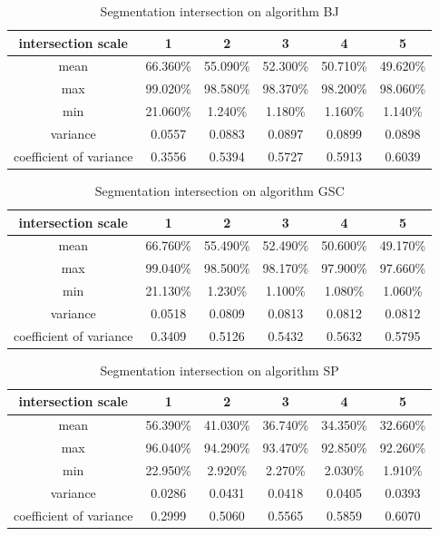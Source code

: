 \documentclass[runningheads,a4paper]{llncs}
\begin{document}
\begin{table}
\centering
\begin{tabular}{|c|c|c|c|c|c|}
\hline
 intersection scale & 1 & 2 & 3 & 4& 5 \\
\hline
mean& 66.360\% & 55.090\% & 52.300\% & 50.710\%& 49.620\% \\
\hline
max& 99.020\% & 98.580\% & 98.370\% & 98.200\%& 98.060\% \\
\hline
min& 21.060\% & 1.240\% & 1.180\% & 1.160\%& 1.140\%\\
\hline
variance& 0.0557 & 0.0883 & 0.0897 & 0.0899& 0.0898 \\
\hline
coefficient of variance& 0.3556 & 0.5394 & 0.5727 & 0.5913& 0.6039\\
\hline
\end{tabular}
\caption{Segmentation intersection on algorithm BJ}
\label{ta:bj intersection}
\end{table}

\begin{table}
\centering
\begin{tabular}{|c|c|c|c|c|c|}
\hline
intersection scale & 1 & 2 & 3 & 4& 5 \\
\hline
mean& 66.760\% & 55.490\% & 52.490\% & 50.600\%& 49.170\% \\
\hline
max& 99.040\% & 98.500\% & 98.170\% & 97.900\%& 97.660\% \\
\hline
min& 21.130\% & 1.230\% & 1.100\% & 1.080\%& 1.060\%\\
\hline
variance& 0.0518 & 0.0809 & 0.0813 & 0.0812& 0.0812 \\
\hline
coefficient of variance& 0.3409 & 0.5126 & 0.5432 & 0.5632& 0.5795\\
\hline
\end{tabular}
\caption{Segmentation intersection on algorithm GSC}
\label{ta:gsc intersection}
\end{table}


\begin{table}
\centering
\begin{tabular}{|c|c|c|c|c|c|}
\hline
intersection scale & 1 & 2 & 3 & 4& 5 \\
\hline
mean& 56.390\% & 41.030\% & 36.740\% & 34.350\%& 32.660\% \\
\hline
max& 96.040\% & 94.290\% & 93.470\% & 92.850\%& 92.260\% \\
\hline
min& 22.950\% & 2.920\% & 2.270\% & 2.030\%& 1.910\%\\
\hline
variance& 0.0286 & 0.0431 & 0.0418& 0.0405&0.0393 \\
\hline
coefficient of variance& 0.2999 & 0.5060 & 0.5565 & 0.5859& 0.6070\\
\hline
\end{tabular}
\caption{Segmentation intersection on algorithm SP}
\label{ta:sp intersection}
\end{table}
\end{document}
